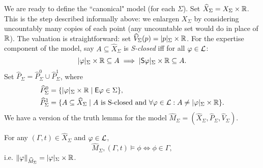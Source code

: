 

We are ready to define the ``canonical" model (for each $\Sigma$). Set
$\widehat{X}_\Sigma = X_\Sigma \times \mathbb{R}$. This is the step described
informally above: we enlargen $X_\Sigma$ by considering uncountably many copies
of each point (any uncountable set would do in place of $\mathbb{R}$). The valuation is
straightforward: set $\widehat{V}_\Sigma(p) = |p|_\Sigma \times \mathbb{R}$. For the
expertise component of the model, say $A \subseteq \widehat{X}_\Sigma$ is
\emph{S-closed} iff for all $\varphi \in \mathcal{L}$:
\[
    |\varphi|_\Sigma \times \mathbb{R} \subseteq A
    \implies |\mathsf{S}\varphi|_\Sigma \times \mathbb{R} \subseteq A.
\]
Set $\widehat{P}_\Sigma = \widehat{P}_\Sigma^0 \cup \widehat{P}_\Sigma^1$,
where
\[
\begin{aligned}
 \widehat{P}_\Sigma^0 &= \{|\varphi|_\Sigma \times \mathbb{R} \mid \mathsf{E}\varphi \in \Sigma\}, \\
 \widehat{P}_\Sigma^1 &= \{
     A \subseteq \widehat{X}_\Sigma
     \mid
     A \text{ is S-closed and }
     \forall \varphi \in \mathcal{L}: A \ne |\varphi|_\Sigma \times \mathbb{R}
 \}.
\end{aligned}
\]
We have a version of the truth lemma for the model $\widehat{M}_\Sigma =
(\widehat{X}_\Sigma, \widehat{P}_\Sigma, \widehat{V}_\Sigma)$.

\begin{lemma}
\label{lemma_truth_lemma}
    For any $(\Gamma, t) \in \widehat{X}_\Sigma$ and $\varphi \in \mathcal{L}$,
    \[
        \widehat{M}_\Sigma, (\Gamma, t) \models \phi
        \iff
        \phi \in \Gamma,
    \]
    i.e. $\|\varphi\|_{\widehat{M}_\Sigma} = |\varphi|_\Sigma \times \mathbb{R}$.
\end{lemma}

